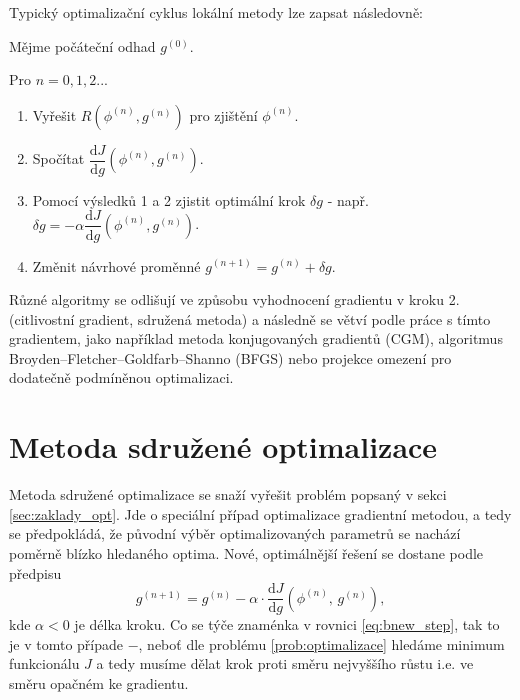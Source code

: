Typický optimalizační cyklus lokální metody lze zapsat následovně:
\begin{addmargin}[3em]{2em}%
	\begin{description}
	\item 	Mějme počáteční odhad $ g^{(0)} $.
	\item 	Pro $ n=0,1,2... $
	 	\begin{enumerate}
			\item Vyřešit $ R(\phi^{(n)},g^{(n)}) $ pro zjištění $ \phi^{(n)} $.
			\item Spočítat $ \dfrac{\mathrm{d}J}{\mathrm{d}g}(\phi^{(n)},g^{(n)}) $.
			\item Pomocí výsledků 1 a 2 zjistit optimální krok $ \delta g $ - např. $ \delta g = -\alpha \dfrac{\mathrm{d}J}{\mathrm{d}g}(\phi^{(n)},g^{(n)}) $.
			\item Změnit návrhové proměnné $ g^{(n+1)} = g^{(n)} + \delta g $.
		\end{enumerate}
	\end{description}
\end{addmargin}
Různé algoritmy se odlišují ve způsobu vyhodnocení gradientu v kroku 2. (citlivostní gradient, sdružená metoda) a následně se větví podle práce s tímto gradientem, jako například metoda konjugovaných gradientů (CGM)\cite{hestenes1952methods}, algoritmus Broyden–Fletcher–Goldfarb–Shanno (BFGS)\cite{fletcher1987practical} nebo projekce omezení \cite{rosen1960gradient} pro dodatečně podmíněnou optimalizaci.  
\newpage
\section{Metoda sdružené optimalizace}

Metoda sdružené optimalizace se snaží vyřešit problém popsaný v sekci \ref{sec:zaklady_opt}. 
Jde o speciální případ optimalizace gradientní metodou, a tedy se předpokládá, že původní výběr optimalizovaných parametrů se nachází poměrně blízko hledaného optima. Nové, optimálnější řešení se dostane podle předpisu
\begin{equation}\label{eq:bnew_step}
g^{(n+1)}=g^{(n)}-\alpha\cdot\dfrac{\mathrm{d}J}{\mathrm{d}g}(\phi^{(n)}, \, g^{(n)}),
\end{equation}
kde $ \alpha < 0 $ je délka kroku. 
Co se týče znaménka v rovnici \ref{eq:bnew_step}, tak to je v tomto případe $ - $, neboť dle problému \ref{prob:optimalizace} hledáme minimum funkcionálu $ J $ a tedy musíme dělat krok proti směru nejvyššího růstu i.e. ve směru opačném ke gradientu.

